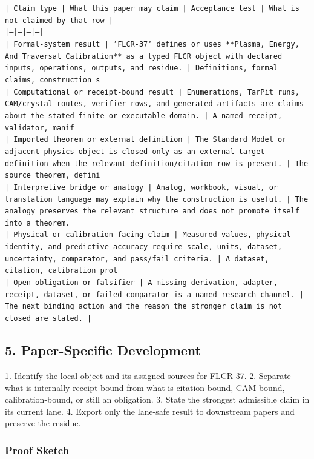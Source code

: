 \documentclass[11pt]{article}
\begin{document}
\noindent\texttt{| Claim type | What this paper may claim | Acceptance test | What is not claimed by that row |}\\
\noindent\texttt{|---|---|---|---|}\\
\noindent\texttt{| Formal-system result | `FLCR-37` defines or uses **Plasma, Energy, And Traversal Calibration** as a typed FLCR object with declared inputs, operations, outputs, and residue. | Definitions, formal claims, construction s}\\
\noindent\texttt{| Computational or receipt-bound result | Enumerations, TarPit runs, CAM/crystal routes, verifier rows, and generated artifacts are claims about the stated finite or executable domain. | A named receipt, validator, manif}\\
\noindent\texttt{| Imported theorem or external definition | The Standard Model or adjacent physics object is closed only as an external target definition when the relevant definition/citation row is present. | The source theorem, defini}\\
\noindent\texttt{| Interpretive bridge or analogy | Analog, workbook, visual, or translation language may explain why the construction is useful. | The analogy preserves the relevant structure and does not promote itself into a theorem. }\\
\noindent\texttt{| Physical or calibration-facing claim | Measured values, physical identity, and predictive accuracy require scale, units, dataset, uncertainty, comparator, and pass/fail criteria. | A dataset, citation, calibration prot}\\
\noindent\texttt{| Open obligation or falsifier | A missing derivation, adapter, receipt, dataset, or failed comparator is a named research channel. | The next binding action and the reason the stronger claim is not closed are stated. | }\\

\subsection*{5. Paper-Specific Development}

1. Identify the local object and its assigned sources for FLCR-37.
2. Separate what is internally receipt-bound from what is citation-bound, CAM-bound, calibration-bound, or still an obligation.
3. State the strongest admissible claim in its current lane.
4. Export only the lane-safe result to downstream papers and preserve the residue.

\subsubsection*{Proof Sketch}
\end{document}
